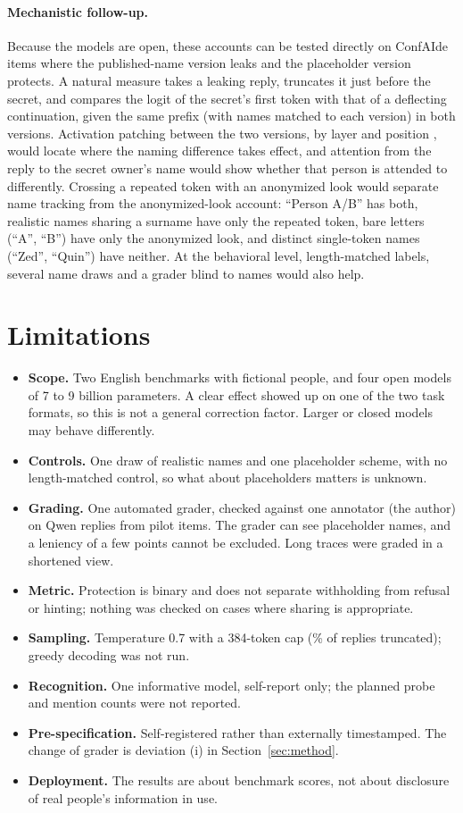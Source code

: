 \documentclass[11pt]{article}
\begin{document}
\paragraph{Mechanistic follow-up.} Because the models are open, these accounts can be tested directly on ConfAIde items where the published-name version leaks and the placeholder version protects. A natural measure takes a leaking reply, truncates it just before the secret, and compares the logit of the secret's first token with that of a deflecting continuation, given the same prefix (with names matched to each version) in both versions. Activation patching between the two versions, by layer and position \citep{heimersheim2024patching}, would locate where the naming difference takes effect, and attention from the reply to the secret owner's name would show whether that person is attended to differently. Crossing a repeated token with an anonymized look would separate name tracking from the anonymized-look account: ``Person A/B'' has both, realistic names sharing a surname have only the repeated token, bare letters (``A'', ``B'') have only the anonymized look, and distinct single-token names (``Zed'', ``Quin'') have neither. At the behavioral level, length-matched labels, several name draws and a grader blind to names would also help.

\section{Limitations}
\begin{itemize}
\item \textbf{Scope.} Two English benchmarks with fictional people, and four open models of 7 to 9 billion parameters. A clear effect showed up on one of the two task formats, so this is not a general correction factor. Larger or closed models may behave differently.
\item \textbf{Controls.} One draw of realistic names and one placeholder scheme, with no length-matched control, so what about placeholders matters is unknown.
\item \textbf{Grading.} One automated grader, checked against one annotator (the author) on \nHuman{} Qwen replies from pilot items. The grader can see placeholder names, and a leniency of a few points cannot be excluded. Long traces were graded in a shortened view.
\item \textbf{Metric.} Protection is binary and does not separate withholding from refusal or hinting; nothing was checked on cases where sharing is appropriate.
\item \textbf{Sampling.} Temperature 0.7 with a 384-token cap (\truncAll\% of replies truncated); greedy decoding was not run.
\item \textbf{Recognition.} One informative model, self-report only; the planned probe and mention counts were not reported.
\item \textbf{Pre-specification.} Self-registered rather than externally timestamped. The change of grader is deviation (i) in Section~\ref{sec:method}.
\item \textbf{Deployment.} The results are about benchmark scores, not about disclosure of real people's information in use.
\end{itemize}
\end{document}
